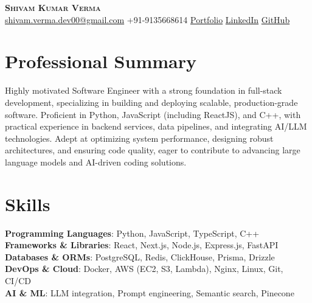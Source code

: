 \documentclass[letterpaper,10pt]{article}
\begin{document}
\begin{center}
  \textbf{\Huge \scshape Shivam Kumar Verma} \\ \vspace{4pt}
  \small \href{mailto:shivam.verma.dev00@gmail.com}{shivam.verma.dev00@gmail.com} \textbullet{} +91-9135668614 \textbullet{} \href{Portfolio}{Portfolio} \textbullet{} \href{LinkedIn}{LinkedIn} \textbullet{} \href{GitHub}{GitHub}
\end{center}

\section{Professional Summary}
\vspace{3pt}
\small{Highly motivated Software Engineer with a strong foundation in full-stack development, specializing in building and deploying scalable, production-grade software. Proficient in Python, JavaScript (including ReactJS), and C++, with practical experience in backend services, data pipelines, and integrating AI/LLM technologies. Adept at optimizing system performance, designing robust architectures, and ensuring code quality, eager to contribute to advancing large language models and AI-driven coding solutions.}

\section{Skills}
\begin{itemize}[leftmargin=0.15in, label={}]
  \small{\item{
    \textbf{Programming Languages}{: Python, JavaScript, TypeScript, C++} \\ \vspace{2pt}
    \textbf{Frameworks \& Libraries}{: React, Next.js, Node.js, Express.js, FastAPI} \\ \vspace{2pt}
    \textbf{Databases \& ORMs}{: PostgreSQL, Redis, ClickHouse, Prisma, Drizzle} \\ \vspace{2pt}
    \textbf{DevOps \& Cloud}{: Docker, AWS (EC2, S3, Lambda), Nginx, Linux, Git, CI/CD} \\ \vspace{2pt}
    \textbf{AI \& ML}{: LLM integration, Prompt engineering, Semantic search, Pinecone}
  }}
\end{itemize}
\end{document}
